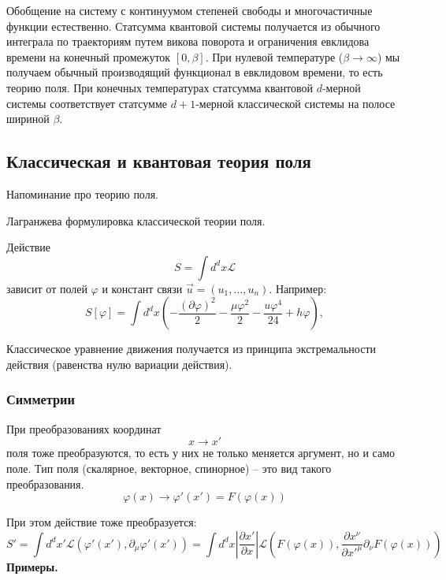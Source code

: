 \documentclass[a4paper,12pt]{article}
\theoremstyle{definition}
\theoremstyle{definition}
\theoremstyle{definition}
\begin{document}
Обобщение на систему с континуумом степеней свободы и многочастичные функции естественно. Статсумма
квантовой системы получается из обычного интеграла по траекториям путем викова поворота и
ограничения евклидова времени на конечный промежуток $[0,\beta]$. При нулевой температуре ($\beta\to
\infty$) мы получаем обычный производящий функционал в евклидовом времени, то есть теорию поля. При
конечных температурах статсумма квантовой $d$-мерной системы соответствует статсумме $d+1$-мерной
классической системы на полосе шириной $\beta$. 

\subsection*{Классическая и квантовая теория поля}
\label{sec:qft}
Напоминание про теорию поля.

Лагранжева формулировка классической теории поля.

 Действие
\begin{equation}
  S=\int d^dx \mathcal{L}
\end{equation}
зависит от полей $\varphi$ и констант связи $\vec u=(u_1,\dots,u_n)$.
Например:
\begin{equation}
  S[\varphi]=\int d^d x\left( -\frac{(\partial \varphi)^2}{2}-\frac{\mu \varphi^2}{2}-\frac{u\varphi^4}{24}+h\varphi\right),
\end{equation}

Классическое уравнение движения получается из принципа экстремальности действия (равенства нулю
вариации действия). 

\subsubsection*{Симметрии}
\label{sec:symmetry}

При преобразованиях координат
\begin{equation}
  \label{eq:303}
  x\to x'
\end{equation}
поля тоже преобразуются, то есть у них не только меняется аргумент, но и само поле. Тип поля
(скалярное, векторное, спинорное) -- это вид такого преобразования. 
\begin{equation}
  \label{eq:304}
  \varphi(x)\to \varphi'(x')=F(\varphi(x))
\end{equation}

При этом действие тоже преобразуется:
\begin{equation}
  \label{eq:305}
  S'=\int d^{d}x' \mathcal{L}(\varphi'(x'),\partial_{\mu} \varphi'(x'))=\int d^{d}x \left|\frac{\partial x'}{\partial x}\right| \mathcal{L}(F(\varphi(x)),\frac{\partial x^{\nu}}{\partial x'^{\mu}} \partial_{\nu}F(\varphi(x)))
\end{equation}
{\bf Примеры.}
\end{document}

